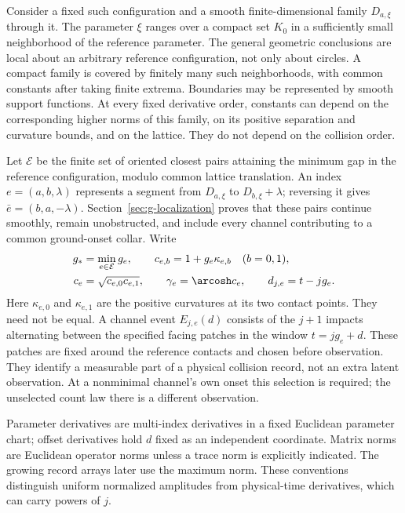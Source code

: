 Consider a fixed such configuration and a smooth finite-dimensional
family $D_{a,\xi}$ through it. The parameter $\xi$ ranges over a compact
set $K_0$ in a sufficiently small neighborhood of the reference parameter.
The general geometric conclusions are local about an arbitrary reference configuration,
not only about circles. A compact family is covered by finitely many
such neighborhoods, with common constants after taking finite extrema.
Boundaries may be represented by smooth support functions. At every
fixed derivative order, constants can depend on the corresponding
higher norms of this family, on its positive separation and curvature
bounds, and on the lattice. They do not depend on the collision order.

Let $\mathcal E$ be the finite set of oriented closest pairs attaining
the minimum gap in the reference configuration, modulo common lattice
translation. An index $e=(a,b,\lambda)$ represents a segment from
$D_{a,\xi}$ to $D_{b,\xi}+\lambda$; reversing it gives
$\bar e=(b,a,-\lambda)$. Section~\ref{sec:g-localization} proves that
these pairs continue smoothly, remain unobstructed, and include every
channel contributing to a common ground-onset collar. Write
\begin{equation}\label{eq:g-general-data}
 \begin{split}
 g_*&=\min_{e\in\mathcal E}g_e,\qquad
 c_{e,b}=1+g_e\kappa_{e,b}\quad(b=0,1),\\
 c_e&=\sqrt{c_{e,0}c_{e,1}},\qquad \gamma_e=\arcosh c_e,
 \qquad d_{j,e}=t-jg_e.
 \end{split}
\end{equation}
Here $\kappa_{e,0}$ and $\kappa_{e,1}$ are the positive curvatures at
its two contact points. They need not be equal. A channel event
$E_{j,e}(d)$ consists of the $j+1$ impacts alternating between the
specified facing patches in the window $t=jg_e+d$. These patches are
fixed around the reference contacts and chosen before observation.
They identify a measurable part of a physical collision record, not an
extra latent observation. At a nonminimal channel's own onset this
selection is required; the unselected count law there is a different
observation.

Parameter derivatives are multi-index derivatives in a fixed Euclidean
parameter chart; offset derivatives hold $d$ fixed as an independent
coordinate. Matrix norms are Euclidean operator norms unless a trace
norm is explicitly indicated. The growing record arrays later use the
maximum norm. These conventions distinguish uniform normalized
amplitudes from physical-time derivatives, which can carry powers of $j$.


